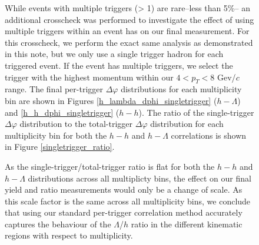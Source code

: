 \documentclass[ALICE,manyauthors]{ALICE_analysis_notes}
\begin{document}
\begin{figure}[ht]
While events with multiple triggers (> 1) are rare--less than 5\%-- an additional crosscheck was performed to investigate the effect of using multiple triggers within an event has on our final measurement. For this crosscheck, we perform the exact same analysis as demonstrated in this note, but we only use a single trigger hadron for each triggered event. If the event has multiple triggers, we select the trigger with the highest momentum within our $4 < p_{T} < 8$ Gev/$c$ range. The final per-trigger $\Delta\varphi$ distributions for each multiplicity bin are shown in Figures \ref{h_lambda_dphi_singletrigger} ($h-\Lambda$) and \ref{h_h_dphi_singletrigger} ($h-h$). The ratio of the single-trigger $\Delta\varphi$ distribution to the total-trigger $\Delta\varphi$ distribution for each multiplicity bin for both the $h-h$ and $h-\Lambda$ correlations is shown in Figure \ref{singletrigger_ratio}.

As the single-trigger/total-trigger ratio is flat for both the $h-h$ and $h-\Lambda$ distributions across all multiplicty bins, the effect on our final yield and ratio measurements would only be a change of scale.  As this scale factor is the same across all multiplicity bins, we conclude that using our standard per-trigger correlation method accurately captures the behaviour of the $\Lambda$/$h$ ratio in the different kinematic regions with respect to multiplicity.


\end{figure}
\end{document}
